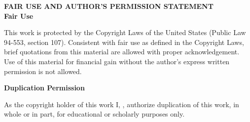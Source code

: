 \thispagestyle{empty}

\singlespacing

\begin{center}

    \textbf{FAIR USE AND AUTHOR'S PERMISSION STATEMENT} \\[2em]
    \textbf{Fair Use} 
\end{center}
\begin{flushleft}

This work is protected by the Copyright Laws of the United States (Public Law 94-553, section 107). Consistent with fair use as defined in the Copyright Laws, brief quotations from this material are allowed with proper acknowledgement. Use of this material for financial gain without the author's express written permission is not allowed. \\[2em]

\end{flushleft}
\begin{center}
    \textbf{Duplication Permission} 
\end{center}

\begin{flushleft}
    As the copyright holder of this work I, \myName, authorize duplication of this work, in whole or in part, for educational or scholarly purposes only. 
    \vfill
\end{flushleft}

\doublespacing